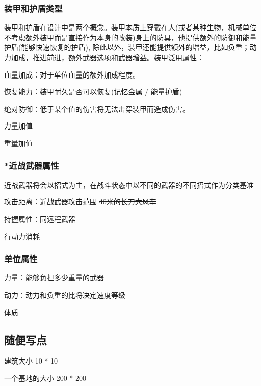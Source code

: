\documentclass[10pt, a4paper]{article}
\begin{document}
    \subsubsection*{装甲和护盾类型}
        装甲和护盾在设计中是两个概念。装甲本质上穿戴在人(或者某种生物，机械单位不考虑额外装甲而是直接作为本身的改装)身上的防具，他提供额外的防御和能量护盾(能够快速恢复的护盾), 除此以外，装甲还能提供额外的增益，比如负重；动力加成，推进前进，额外武器选项和武器增益。装甲泛用属性：

        \quad 血量加成：对于单位血量的额外加成程度。

        \quad 恢复能力：装甲耐久是否可以恢复(记忆金属 / 能量护盾)

        \quad 绝对防御：低于某个值的伤害将无法击穿装甲而造成伤害。

        \quad 力量加值

        \quad 重量加值



    \subsubsection*{*近战武器属性}

        近战武器将会以招式为主，在战斗状态中以不同的武器的不同招式作为分类基准

        攻击距离：近战武器攻击范围 \sout{40米的长刀大风车}

        持握属性：同远程武器

        行动力消耗

    \subsubsection*{单位属性}

        \quad 力量：能够负担多少重量的武器

        \quad 动力：动力和负重的比将决定速度等级
        
        \quad 体质

        

    \subsection*{随便写点}
        建筑大小 10 * 10 

        一个基地的大小 200 * 200 
\end{document}
